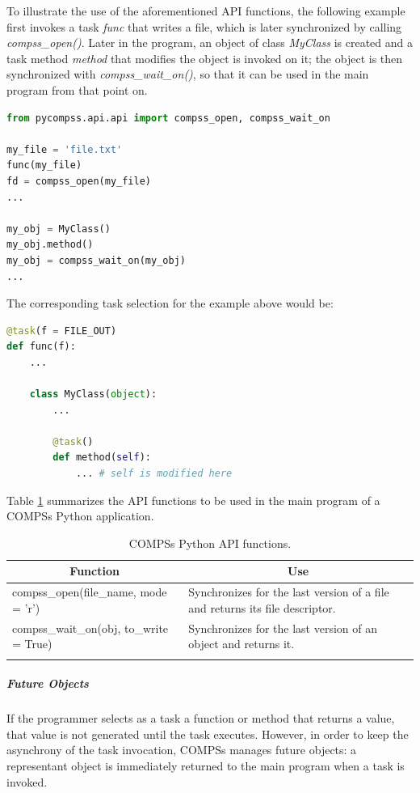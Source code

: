 To illustrate the use of the aforementioned API functions, the following example first invokes a task {\it func} that writes a file, which is later synchronized by calling {\it compss\_open()}. Later in the program, an object of class {\it MyClass} is created and a task method {\it method} that modifies the object is invoked on it; the object is then synchronized with {\it compss\_wait\_on()}, so that it can be used in the main program from that point on.

\begin{lstlisting}[language=python]
from pycompss.api.api import compss_open, compss_wait_on

my_file = 'file.txt'
func(my_file)
fd = compss_open(my_file)
...

my_obj = MyClass()
my_obj.method()
my_obj = compss_wait_on(my_obj)
...
\end{lstlisting}

The corresponding task selection for the example above would be:

\begin{lstlisting}[language=python]
@task(f = FILE_OUT)
def func(f):
    ...
    
    class MyClass(object):
        ...
        
        @task()
        def method(self):
            ... # self is modified here
\end{lstlisting}

Table \ref{tab:python_api_functions} summarizes the API functions to be used in the main program of a COMPSs Python application.

\begin{longtable}{| p{} | p{} |}
\hline
\multicolumn{1}{|c|}{{\bf Function }}    &  \multicolumn{1}{c|}{{\bf Use }}\\
\hline
compss\_open(file\_name, mode = 'r') & Synchronizes for the last version of a file and returns its file descriptor. \\
\hline
compss\_wait\_on(obj, to\_write = True) & Synchronizes for the last version of an object and returns it. \\
\hline
\caption{COMPSs Python API functions.}
\label{tab:python_api_functions}
\end{longtable}


\subparagraph{Future Objects}
If the programmer selects as a task a function or method that returns a value, that value is not generated until the task executes. However, in order to keep the asynchrony of the task invocation, COMPSs manages future objects: a representant object is immediately returned to the main program when a task is invoked.

